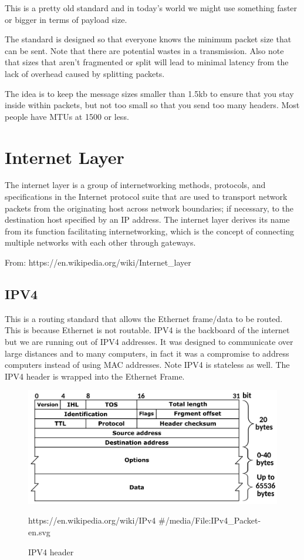 \documentclass[../CMPUT-404-Notes.tex]{subfiles}
\begin{document}
\begin{Note}
  This is a pretty old standard and in today's world we might use something faster or bigger in terms of payload size.  
\end{Note}

The standard is designed so that everyone knows the minimum packet size that can be sent. 
Note that there are potential wastes in a transmission.
Also note that sizes that aren't fragmented or split will lead to minimal latency from the lack of overhead caused by splitting packets.

The idea is to keep the message sizes smaller than 1.5kb to ensure that you stay inside within packets, but not too small so that you send too many headers. Most people have MTUs at 1500 or less.


\section{Internet Layer}
\begin{quotebox}
  The internet layer is a group of internetworking methods, protocols, and specifications in the Internet protocol suite that are used to transport network packets from the originating host across network boundaries; if necessary, to the destination host specified by an IP address. The internet layer derives its name from its function facilitating internetworking, which is the concept of connecting multiple networks with each other through gateways.

  From: https://en.wikipedia.org/wiki/Internet\_layer
\end{quotebox}
\subsection{IPV4}
This is a routing standard that allows the Ethernet frame/data to be routed. This is because Ethernet is not routable. 
IPV4 is the backboard of the internet but we are running out of IPV4 addresses. 
It was designed to communicate over large distances and to many computers, in fact it was a compromise to address computers instead of using MAC addresses. 
Note IPV4 is stateless as well.
The IPV4 header is wrapped into the Ethernet Frame.

\begin{figure}[!h]
  \centering
  \includegraphics[width=\columnwidth]{../assets/IPv4-Packet-en.png}
  \caption{IPV4 header}
  \label{fig:-assets-IPv4-Packet-en-svg-png}
  https://en.wikipedia.org/wiki/IPv4 \#/media/File:IPv4\_Packet-en.svg
\end{figure}
\vspace{-10pt}
\end{document}
